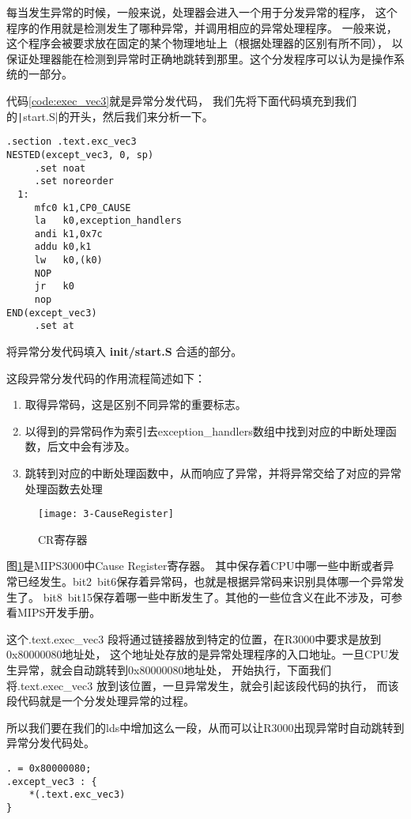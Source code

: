 每当发生异常的时候，一般来说，处理器会进入一个用于分发异常的程序，
这个程序的作用就是检测发生了哪种异常，并调用相应的异常处理程序。
一般来说，这个程序会被要求放在固定的某个物理地址上（根据处理器的区别有所不同），
以保证处理器能在检测到异常时正确地跳转到那里。这个分发程序可以认为是操作系统的一部分。

代码\ref{code:exec_vec3}就是异常分发代码，
我们先将下面代码填充到我们的\texttt|start.S|的开头，然后我们来分析一下。

\label{code:exec_vec3}
\begin{verbatim}
.section .text.exc_vec3
NESTED(except_vec3, 0, sp)
     .set noat
     .set noreorder
  1:
     mfc0 k1,CP0_CAUSE
     la   k0,exception_handlers
     andi k1,0x7c
     addu k0,k1
     lw   k0,(k0)
     NOP
     jr   k0
     nop
END(except_vec3)
     .set at
\end{verbatim}

\begin{exercise}
将异常分发代码填入 \textbf{init/start.S} 合适的部分。
\end{exercise}

这段异常分发代码的作用流程简述如下：
\begin{enumerate}
  \item 取得异常码，这是区别不同异常的重要标志。
  \item 以得到的异常码作为索引去exception\_handlers数组中找到对应的中断处理函数，后文中会有涉及。
  \item 跳转到对应的中断处理函数中，从而响应了异常，并将异常交给了对应的异常处理函数去处理
\end{enumerate}

\begin{figure}[htbp]
  \centering
  \texttt{[image: 3-CauseRegister]}
  \caption{CR寄存器}\label{fig:3-CauseRegister} 
\end{figure}
图\ref{fig:3-CauseRegister}是MIPS3000中Cause Register寄存器。
其中保存着CPU中哪一些中断或者异常已经发生。bit2~bit6保存着异常码，也就是根据异常码来识别具体哪一个异常发生了。
bit8~bit15保存着哪一些中断发生了。其他的一些位含义在此不涉及，可参看MIPS开发手册。

这个.text.exec\_vec3 段将通过链接器放到特定的位置，在R3000中要求是放到0x80000080地址处，
这个地址处存放的是异常处理程序的入口地址。一旦CPU发生异常，就会自动跳转到0x80000080地址处，
开始执行，下面我们将.text.exec\_vec3 放到该位置，一旦异常发生，就会引起该段代码的执行，
而该段代码就是一个分发处理异常的过程。

所以我们要在我们的lds中增加这么一段，从而可以让R3000出现异常时自动跳转到异常分发代码处。
\begin{verbatim}
. = 0x80000080;
.except_vec3 : {
    *(.text.exc_vec3)
}
\end{verbatim}


